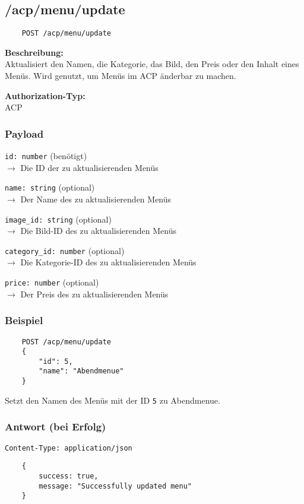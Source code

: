 \subsection{/acp/menu/update}

\begin{lstlisting}
    POST /acp/menu/update
\end{lstlisting}

\textbf{Beschreibung:} \\
Aktualisiert den Namen, die Kategorie, das Bild, den Preis oder den Inhalt eines Menüs. Wird genutzt, um Menüs im ACP änderbar zu machen.

\textbf{Authorization-Typ:} \\
ACP

\subsubsection{Payload}

\lstinline{id: number} (benötigt) \\
$\rightarrow$ Die ID der zu aktualisierenden Menüs

\lstinline{name: string} (optional) \\
$\rightarrow$ Der Name des zu aktualisierenden Menüs

\lstinline{image_id: string} (optional) \\
$\rightarrow$ Die Bild-ID des zu aktualisierenden Menüs

\lstinline{category_id: number} (optional) \\
$\rightarrow$ Die Kategorie-ID des zu aktualisierenden Menüs

\lstinline{price: number} (optional) \\
$\rightarrow$ Der Preis des zu aktualisierenden Menüs

\subsubsection{Beispiel}

\begin{lstlisting}
    POST /acp/menu/update
    {
        "id": 5,
        "name": "Abendmenue"
    }
\end{lstlisting}

Setzt den Namen des Menüs mit der ID \lstinline{5} zu \glqq Abendmenue\grqq.

\subsubsection{Antwort (bei Erfolg)}

\lstinline{Content-Type: application/json}
\begin{lstlisting}
    {
        success: true, 
        message: "Successfully updated menu"
    }
\end{lstlisting}